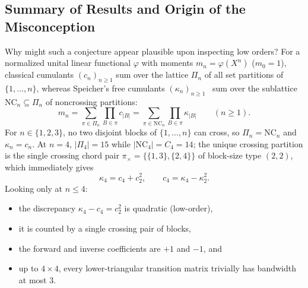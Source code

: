 \documentclass[11pt,a4paper]{article}
\theoremstyle{definition}
\theoremstyle{remark}
\newcommand{\NC}{\mathrm{NC}}
\begin{document}
\subsection{Summary of Results and Origin of the Misconception}

Why might such a conjecture appear plausible upon inspecting low orders? For a normalized unital linear functional $\varphi$ with moments $m_n = \varphi(X^n)$ ($m_0 = 1$), classical cumulants $(c_n)_{n \ge 1}$ sum over the lattice $\Pi_n$ of all set partitions of $\{1,\dots,n\}$, whereas Speicher's free cumulants $(\kappa_n)_{n \ge 1}$~\cite{Speicher1994,NicaSpeicher2006} sum over the sublattice $\NC_n \subseteq \Pi_n$ of noncrossing partitions:
\begin{equation}\label{eq:moment-cumulant}
  m_n = \sum_{\pi \in \Pi_n} \prod_{B \in \pi} c_{|B|}
      = \sum_{\pi \in \NC_n} \prod_{B \in \pi} \kappa_{|B|}
  \qquad (n \ge 1).
\end{equation}
For $n \in \{1,2,3\}$, no two disjoint blocks of $\{1,\dots,n\}$ can cross, so $\Pi_n = \NC_n$ and $\kappa_n = c_n$. At $n = 4$, $|\Pi_4| = 15$ while $|\NC_4| = C_4 = 14$; the unique crossing partition is the single crossing chord pair $\pi_\times = \{\{1,3\},\{2,4\}\}$ of block-size type $(2,2)$, which immediately gives
\begin{equation}\label{eq:n4-pair}
  \kappa_4 = c_4 + c_2^2, \qquad c_4 = \kappa_4 - \kappa_2^2.
\end{equation}
Looking only at $n \le 4$:
\begin{itemize}
  \item the discrepancy $\kappa_4 - c_4 = c_2^2$ is quadratic (low-order),
  \item it is counted by a single crossing pair of blocks,
  \item the forward and inverse coefficients are $+1$ and $-1$, and
  \item up to $4 \times 4$, every lower-triangular transition matrix trivially has bandwidth at most $3$.
\end{itemize}
\end{document}
